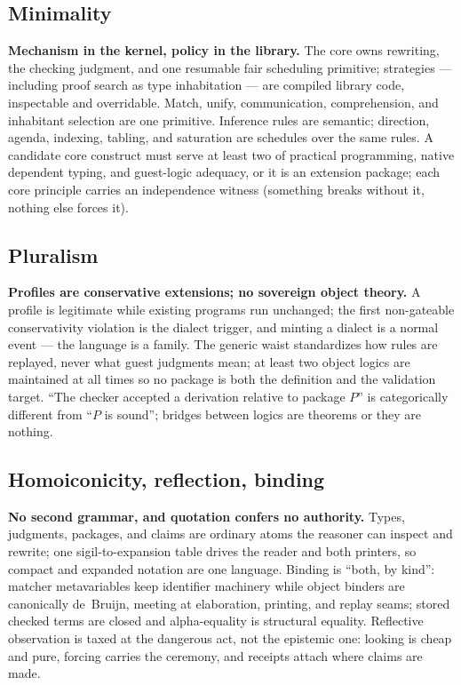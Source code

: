 \documentclass[11pt]{article}
\begin{document}
\subsection{Minimality}
\textbf{Mechanism in the kernel, policy in the library.}  The core owns
rewriting, the checking judgment, and one resumable fair scheduling
primitive; strategies --- including proof search as type inhabitation ---
are compiled library code, inspectable and overridable.  Match, unify,
communication, comprehension, and inhabitant selection are one primitive.
Inference rules are semantic; direction, agenda, indexing, tabling, and
saturation are schedules over the same rules.  A candidate core construct
must serve at least two of practical programming, native dependent
typing, and guest-logic adequacy, or it is an extension package; each
core principle carries an independence witness (something breaks without
it, nothing else forces it).

\subsection{Pluralism}
\textbf{Profiles are conservative extensions; no sovereign object
theory.}  A profile is legitimate while existing programs run unchanged;
the first non-gateable conservativity violation is the dialect trigger,
and minting a dialect is a normal event --- the language is a family.
The generic waist standardizes how rules are replayed, never what guest
judgments mean; at least two object logics are maintained at all times so
no package is both the definition and the validation target.  ``The
checker accepted a derivation relative to package $P$'' is categorically
different from ``$P$ is sound''; bridges between logics are theorems or
they are nothing.

\subsection{Homoiconicity, reflection, binding}
\textbf{No second grammar, and quotation confers no authority.}  Types,
judgments, packages, and claims are ordinary atoms the reasoner can
inspect and rewrite; one sigil-to-expansion table drives the reader and
both printers, so compact and expanded notation are one language.
Binding is ``both, by kind'': matcher metavariables keep identifier
machinery while object binders are canonically de~Bruijn, meeting at
elaboration, printing, and replay seams; stored checked terms are closed
and alpha-equality is structural equality.  Reflective observation is
taxed at the dangerous act, not the epistemic one: looking is cheap and
pure, forcing carries the ceremony, and receipts attach where claims are
made.
\end{document}
